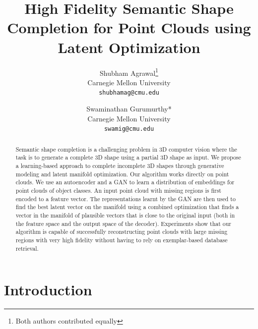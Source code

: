 \documentclass[10pt,twocolumn,letterpaper]{article}
\begin{document}
\title{High Fidelity Semantic Shape Completion for Point Clouds using Latent Optimization}

\author{ Shubham Agrawal\thanks{Both authors contributed equally} \\
Carnegie Mellon University\\
{\tt\small shubhamag@cmu.edu}
\and
Swaminathan Gurumurthy* \\
Carnegie Mellon University\\
{\tt\small swamig@cmu.edu}
}

\maketitle


\begin{abstract}
Semantic shape completion is a challenging problem in 3D computer vision where the task is to generate a complete 3D shape using a partial 3D shape as input.
We propose a learning-based approach to complete incomplete 3D shapes through generative modeling and latent manifold optimization. Our algorithm works directly on point clouds. We use an autoencoder and a GAN to learn a distribution of embeddings for point clouds of object classes. An input point cloud with missing regions is first encoded to a feature vector. The representations learnt by the GAN are then used to find the best latent vector on the manifold using a combined optimization that finds a vector in the manifold of plausible vectors that is close to the original input (both in the feature space and the output space of the decoder). Experiments show that our algorithm is capable of successfully reconstructing point clouds with large missing regions with very high fidelity without having to rely on exemplar-based database retrieval. 
\end{abstract}
\section{Introduction}
\end{document}
